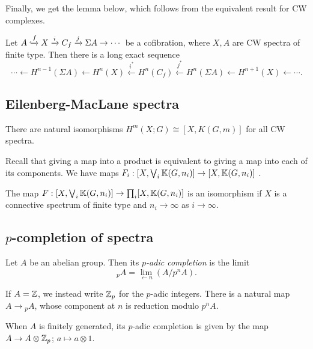 \documentclass{MetricNotes2023}
\def\bb{\ensuremath\mathbb}
\def\xinj{\ensuremath\xhookrightarrow}
\def\inte{\ensuremath\mathbb{Z}}
\begin{document}
Finally, we get the lemma below, which follows from the equivalent result for CW complexes. 

\begin{lemma}\label{2504140954}
Let \(A \xinj f X \xrightarrow{i} C_f \xrightarrow{j} \Sigma A \to \cdots\) be a cofibration, where \(X, A\) are CW spectra of finite type. Then there is a long exact sequence 
\[\cdots \leftarrow H^{n-1}(\Sigma A) \leftarrow H^n(X) \xleftarrow{i^*} H^n(C_f) \xleftarrow{j^*} H^n(\Sigma A)\leftarrow H^{n+1}(X) \leftarrow \cdots.\]
\end{lemma}

\subsection{Eilenberg-MacLane spectra}

\begin{theorem}\label{2503221328}
There are natural isomorphisms \(H^m(X;G)\cong [X,K(G,m)]\) for all CW spectra.
\end{theorem}

Recall that giving a map into a product is equivalent to giving a map into each of its components. We have maps \(F_i : [X, \bigvee_i \bb{K}(G,n_i)]\to [X,\bb{K}(G,n_i)]\) .

\begin{proposition}\label{2503231218}
The map \(F : [X, \bigvee_i \bb{K}(G,n_i)]\to \prod_i [X,\bb{K}(G,n_i)]\) is an isomorphism if \(X\) is a connective spectrum of finite type and \(n_i\to \infty\) as \(i\to\infty\). 
\end{proposition}

\subsection{\(p\)-completion of spectra}



\begin{definition}
Let \(A\) be an abelian group. Then its \textit{\(p\)-adic completion} is the limit 
\[\text{}_pA=\lim\limits_{\leftarrow n} (A/p^nA).\]
\end{definition}

If \(A=\inte\), we instead write \(\inte_p\) for the \(p\)-adic integers. There is a natural map \(A \to \text{}_pA\), whose component at \(n\) is reduction modulo \(p^nA\). 

When \(A\) is finitely generated, its \(p\)-adic completion is given by the map \(A \to A\otimes \inte_p\); \(a\mapsto a\otimes 1\). 
\end{document}
